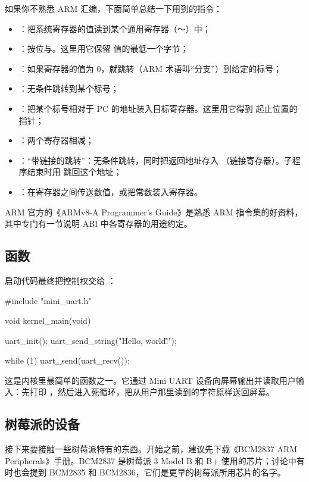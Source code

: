 如果你不熟悉 ARM 汇编，下面简单总结一下用到的指令：

\begin{itemize}
  \item {}：把系统寄存器的值读到某个通用寄存器（～）中；
  \item {}：按位与。这里用它保留  值的最低一个字节；
  \item {}：如果寄存器的值为 0，就跳转（ARM 术语叫“分支”）到给定的标号；
  \item {}：无条件跳转到某个标号；
  \item {}：把某个标号相对于 PC 的地址装入目标寄存器。这里用它得到  起止位置的指针；
  \item {}：两个寄存器相减；
  \item {}：“带链接的跳转”：无条件跳转，同时把返回地址存入 （链接寄存器）。子程序结束时用  跳回这个地址；
  \item {}：在寄存器之间传送数值，或把常数装入寄存器。
\end{itemize}

ARM 官方的《ARMv8-A Programmer's Guide》是熟悉 ARM 指令集的好资料，其中专门有一节说明 ABI 中各寄存器的用途约定。

\subsection{ 函数}

启动代码最终把控制权交给 ：

\begin{ccode}
#include "mini_uart.h"

void kernel_main(void)
{
	uart_init();
	uart_send_string("Hello, world!\r\n");

	while (1) {
		uart_send(uart_recv());
	}
}
\end{ccode}

这是内核里最简单的函数之一。它通过 Mini UART 设备向屏幕输出并读取用户输入：先打印 ，然后进入死循环，把从用户那里读到的字符原样送回屏幕。

\subsection{树莓派的设备}

接下来要接触一些树莓派特有的东西。开始之前，建议先下载《BCM2837 ARM Peripherals》手册\cite{bcm2835}。BCM2837 是树莓派 3 Model B 和 B+ 使用的芯片；讨论中有时也会提到 BCM2835 和 BCM2836，它们是更早的树莓派所用芯片的名字。

